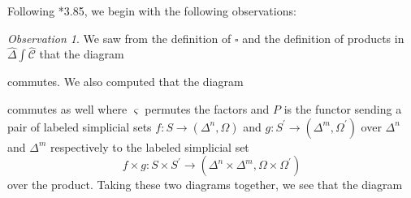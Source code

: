 \documentclass[leqno]{article}
\numberwithin{equation}{subsection}
\theoremstyle{plain}   %
\theoremstyle{remark}
\newtheorem{obs}[equation]{Observation}
\theoremstyle{plain}
\DeclareMathOperator{\id}{id}
\newcommand{\overcat}[2]{{\left(#1\downarrow #2\right)}}
\newcommand{\psh}[1]{\ensuremath{\widehat{#1}}}
\providecommand{\C}{}
\renewcommand{\C}{\ensuremath{\mathcal{C}}}
\newcommand{\cellset}{\ensuremath{\widehat{\Theta[\mathcal{C}]}}}
\newcommand{\ssetlab}{\ensuremath{\widehat{\Delta} \int \widehat{\mathcal{C}}}}
\begin{document}
Following \cite{oury}*{3.85}, we begin with the following observations:

\begin{obs}\label{square1}
	We saw from the definition of \(\square\) and the definition of products in \(\ssetlab\) that the diagram 
	\begin{center}
	\end{center}
	commutes.  We also computed that the diagram
	\begin{center}
	\end{center}
	commutes as well where \(\varsigma\) permutes the factors and \(P\) is the functor sending a pair of labeled simplicial sets \(f:S\to (\Delta^n,\Omega)\) and \(g:S^\prime\to (\Delta^m,\Omega^\prime)\) over \(\Delta^n\) and \(\Delta^m\) respectively to the labeled simplicial set \[f\times g:S\times S^\prime \to (\Delta^n\times \Delta^m,\Omega\times \Omega^\prime)\] over the product.  Taking these two diagrams together, we see that the diagram 

\end{obs}
\end{document}
